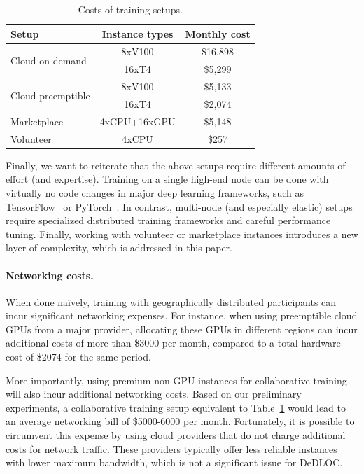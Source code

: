 \begin{table}[b]
\vspace{-14pt}
\renewcommand{\arraystretch}{1.1}
\centering
\caption{Costs of training setups.}
\vspace{6pt}
\label{tab:cost}
\begin{tabular}{@{}lcc@{}}
\toprule
Setup & Instance types & Monthly cost \\ \midrule 
\multirow{2}{*}{Cloud on-demand} & 8xV100 & \$16,898 \\
 & 16xT4 & \$5,299 \\ 
\multirow{2}{*}{Cloud preemptible} & 8xV100 & \$5,133 \\
 & 16xT4 & \$2,074 \\
Marketplace & 4xCPU+16xGPU & \$5,148 \\ 
Volunteer & 4xCPU & \$257 \\ \bottomrule
\end{tabular}
\end{table}

Finally, we want to reiterate that the above setups require different amounts of effort (and expertise). Training on a single high-end node can be done with virtually no code changes in major deep learning frameworks, such as TensorFlow~\cite{tensorflow2015-whitepaper} or PyTorch~\cite{paszke2019pytorch}. In contrast, multi-node (and especially elastic) setups require specialized distributed training frameworks and careful performance tuning. Finally, working with volunteer or marketplace instances introduces a new layer of complexity, which is addressed in this paper.

\paragraph{Networking costs.} When done naïvely, training with geographically distributed participants can incur significant networking expenses. For instance, when using preemptible cloud GPUs from a major provider, allocating these GPUs in different regions can incur additional costs of more than \$3000 per month, compared to a total hardware cost of \$2074 for the same period.

More importantly, using premium non-GPU instances for collaborative training will also incur additional networking costs. Based on our preliminary experiments, a collaborative training setup equivalent to Table~\ref{tab:cost} would lead to an average networking bill of \$5000-6000 per month.
Fortunately, it is possible to circumvent this expense by using cloud providers that do not charge additional costs for network traffic. These providers typically offer less reliable instances with lower maximum bandwidth, which is not a significant issue for DeDLOC.

